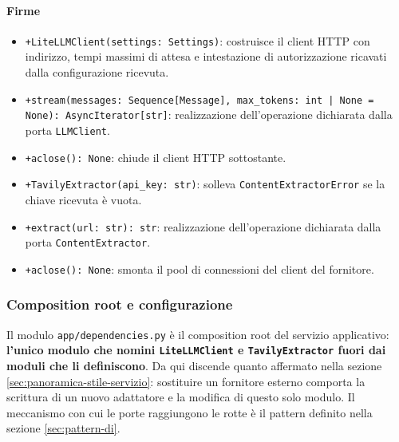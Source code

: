 \documentclass[a4paper, 10pt]{article}
\newenvironment{firme}{%
  \begin{itemize}[leftmargin=1.4em, topsep=4pt, itemsep=4pt, parsep=0pt]
  \raggedright
}{%
  \end{itemize}%
}
\begin{document}
\paragraph{Firme}
\begin{firme}
    \item \texttt{+LiteLLMClient(settings: Settings)}: costruisce il client HTTP con indirizzo, tempi massimi di attesa e intestazione di autorizzazione ricavati dalla configurazione ricevuta.

    \item \texttt{+stream(messages: Sequence[Message], max\_tokens: int | None = None): AsyncIterator[str]}: realizzazione dell'operazione dichiarata dalla porta \texttt{LLMClient}.

    \item \texttt{+aclose(): None}: chiude il client HTTP sottostante.

    \item \texttt{+TavilyExtractor(api\_key: str)}: solleva \texttt{ContentExtractorError} se la chiave ricevuta è vuota.

    \item \texttt{+extract(url: str): str}: realizzazione dell'operazione dichiarata dalla porta \texttt{ContentExtractor}.

    \item \texttt{+aclose(): None}: smonta il pool di connessioni del client del fornitore.
\end{firme}

\subsubsection{Composition root e configurazione}
\label{sec:backend-composition-root}
Il modulo \texttt{app/dependencies.py} è il composition root del servizio applicativo: \textbf{l'unico modulo che nomini \texttt{LiteLLMClient} e \texttt{TavilyExtractor} fuori dai moduli che li definiscono}. Da qui discende quanto affermato nella sezione \ref{sec:panoramica-stile-servizio}: sostituire un fornitore esterno comporta la scrittura di un nuovo adattatore e la modifica di questo solo modulo. Il meccanismo con cui le porte raggiungono le rotte è il pattern definito nella sezione \ref{sec:pattern-di}.
\end{document}

